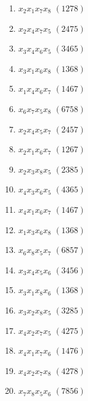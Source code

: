 \documentclass[aps,preprint]{revtex4}%
\begin{document}
\begin{enumerate}
\begin{enumerate}
\item $x_{2}x_{1}x_{7}x_{8}$ $\left(  1278\right)  $

\item $x_{2}x_{4}x_{7}x_{5}$ $\left(  2475\right)  $

\item $x_{3}x_{4}x_{6}x_{5}$ $\left(  3465\right)  $

\item $x_{3}x_{1}x_{6}x_{8}$ $\left(  1368\right)  $

\item $x_{1}x_{4}x_{6}x_{7}$ $\left(  1467\right)  $

\item $x_{6}x_{7}x_{5}x_{8}$ $\left(  6758\right)  $

\item $x_{2}x_{4}x_{5}x_{7}$ $\left(  2457\right)  $

\item $x_{2}x_{1}x_{6}x_{7}$ $\left(  1267\right)  $

\item $x_{2}x_{3}x_{8}x_{5}$ $\left(  2385\right)  $

\item $x_{4}x_{3}x_{6}x_{5}$ $\left(  4365\right)  $

\item $x_{4}x_{1}x_{6}x_{7}$ $\left(  1467\right)  $

\item $x_{1}x_{3}x_{6}x_{8}$ $\left(  1368\right)  $

\item $x_{6}x_{8}x_{5}x_{7}$ $\left(  6857\right)  $

\item $x_{3}x_{4}x_{5}x_{6}$ $\left(  3456\right)  $

\item $x_{3}x_{1}x_{8}x_{6}$ $\left(  1368\right)  $

\item $x_{3}x_{2}x_{8}x_{5}$ $\left(  3285\right)  $

\item $x_{4}x_{2}x_{7}x_{5}$ $\left(  4275\right)  $

\item $x_{4}x_{1}x_{7}x_{6}$ $\left(  1476\right)  $

\item $x_{4}x_{2}x_{7}x_{8}$ $\left(  4278\right)  $

\item $x_{7}x_{8}x_{5}x_{6}$ $\left(  7856\right)  $
\end{enumerate}
\end{enumerate}
\end{document}
